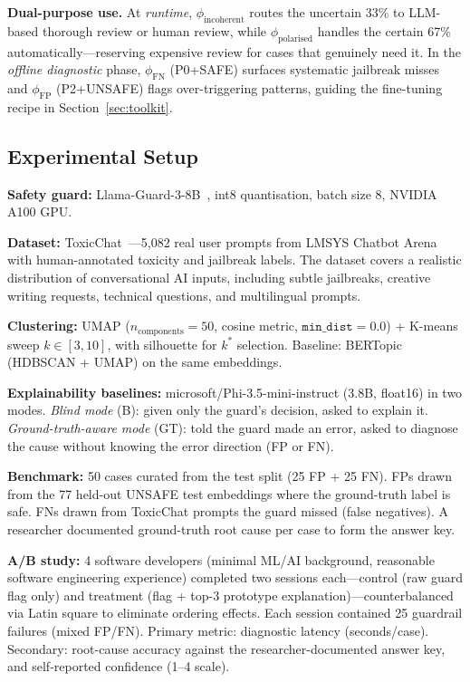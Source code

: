 \documentclass[letterpaper]{article}
\begin{document}
\noindent\textbf{Dual-purpose use.}
At \emph{runtime}, $\phi_\text{incoherent}$ routes the uncertain 33\% to LLM-based
thorough review or human review, while $\phi_\text{polarised}$ handles the certain
67\% automatically---reserving expensive review for cases that genuinely need it.
In the \emph{offline diagnostic} phase, $\phi_\text{FN}$ (P0+SAFE) surfaces systematic
jailbreak misses and $\phi_\text{FP}$ (P2+UNSAFE) flags over-triggering patterns,
guiding the fine-tuning recipe in Section~\ref{sec:toolkit}.


\label{sec:exp}

\subsection{Experimental Setup}

\textbf{Safety guard:} Llama-Guard-3-8B~\cite{inan2023llamaguard}, int8 quantisation,
batch size 8, NVIDIA A100 GPU.

\textbf{Dataset:} ToxicChat~\cite{lin2023toxicchat}---5,082 real user prompts from
LMSYS Chatbot Arena with human-annotated toxicity and jailbreak labels. The dataset
covers a realistic distribution of conversational AI inputs, including subtle jailbreaks,
creative writing requests, technical questions, and multilingual prompts.

\textbf{Clustering:} UMAP ($n_\text{components}{=}50$, cosine metric,
$\texttt{min\_dist}{=}0.0$) + K-means sweep $k \in [3,10]$, with silhouette for $k^*$ selection.
Baseline: BERTopic~\cite{grootendorst2022bertopic} (HDBSCAN + UMAP) on the same embeddings.

\textbf{Explainability baselines:} microsoft/Phi-3.5-mini-instruct (3.8B, float16) in
two modes. \emph{Blind mode} (B): given only the guard's decision, asked to explain it.
\emph{Ground-truth-aware mode} (GT): told the guard made an error, asked to diagnose
the cause without knowing the error direction (FP or FN).

\textbf{Benchmark:} 50 cases curated from the test split (25 FP + 25 FN). FPs drawn
from the 77 held-out UNSAFE test embeddings where the ground-truth label is safe.
FNs drawn from ToxicChat prompts the guard missed (false negatives). A researcher
documented ground-truth root cause per case to form the answer key.

\textbf{A/B study:} 4 software developers (minimal ML/AI background, reasonable software engineering experience) completed two sessions each---control (raw guard
flag only) and treatment (flag + top-3 prototype explanation)---counterbalanced via
Latin square to eliminate ordering effects. Each session contained 25 guardrail failures
(mixed FP/FN). Primary metric: diagnostic latency (seconds/case). Secondary: root-cause
accuracy against the researcher-documented answer key, and self-reported confidence (1--4 scale).
\end{document}

